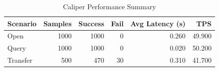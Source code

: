 \begin{table}
\caption{Caliper Performance Summary}
\label{tab:caliper_round}
\begin{tabular}{lrrrrr}
\toprule
Scenario & Samples & Success & Fail & Avg Latency (s) & TPS \\
\midrule
Open & 1000 & 1000 & 0 & 0.260 & 49.900 \\
Query & 1000 & 1000 & 0 & 0.020 & 50.200 \\
Transfer & 500 & 470 & 30 & 0.310 & 41.700 \\
\bottomrule
\end{tabular}
\end{table}
